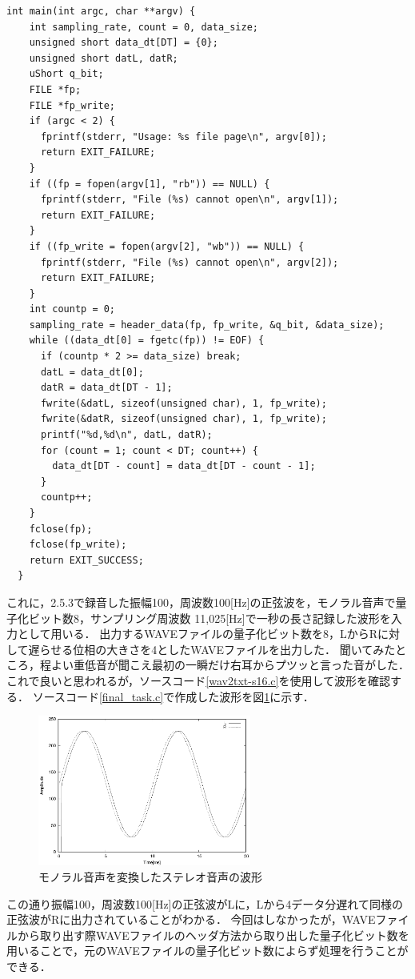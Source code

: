 \documentclass[titlepage]{jarticle}
\begin{document}
\begin{lstlisting}[caption=発展課題,label=final_task.c]
  int main(int argc, char **argv) {
    int sampling_rate, count = 0, data_size;
    unsigned short data_dt[DT] = {0};
    unsigned short datL, datR;
    uShort q_bit;
    FILE *fp;
    FILE *fp_write;
    if (argc < 2) {
      fprintf(stderr, "Usage: %s file page\n", argv[0]);
      return EXIT_FAILURE;
    }
    if ((fp = fopen(argv[1], "rb")) == NULL) {
      fprintf(stderr, "File (%s) cannot open\n", argv[1]);
      return EXIT_FAILURE;
    } 
    if ((fp_write = fopen(argv[2], "wb")) == NULL) {
      fprintf(stderr, "File (%s) cannot open\n", argv[2]);
      return EXIT_FAILURE;
    } 
    int countp = 0;
    sampling_rate = header_data(fp, fp_write, &q_bit, &data_size);
    while ((data_dt[0] = fgetc(fp)) != EOF) {
      if (countp * 2 >= data_size) break;
      datL = data_dt[0];
      datR = data_dt[DT - 1];
      fwrite(&datL, sizeof(unsigned char), 1, fp_write);
      fwrite(&datR, sizeof(unsigned char), 1, fp_write);
      printf("%d,%d\n", datL, datR);
      for (count = 1; count < DT; count++) {
        data_dt[DT - count] = data_dt[DT - count - 1];
      }
      countp++;
    }
    fclose(fp);
    fclose(fp_write);
    return EXIT_SUCCESS;
  }
\end{lstlisting}
これに，2.5.3で録音した振幅100，周波数100[Hz]の正弦波を，モノラル音声で量子化ビット数8，サンプリング周波数 11,025[Hz]で一秒の長さ記録した波形を入力として用いる．
出力するWAVEファイルの量子化ビット数を8，LからRに対して遅らせる位相の大きさを4としたWAVEファイルを出力した．
聞いてみたところ，程よい重低音が聞こえ最初の一瞬だけ右耳からプツッと言った音がした．
これで良いと思われるが，ソースコード\ref{wav2txt-s16.c}を使用して波形を確認する．
ソースコード\ref{final_task.c}で作成した波形を図\ref{final_task}に示す．
\begin{figure}[H]
  \centering
  \includegraphics[width=7cm]{EPS/final_task.eps}
  \caption{モノラル音声を変換したステレオ音声の波形}
  \label{final_task}
\end{figure}
この通り振幅100，周波数100[Hz]の正弦波がLに，Lから4データ分遅れて同様の正弦波がRに出力されていることがわかる．
今回はしなかったが，WAVEファイルから取り出す際WAVEファイルのヘッダ方法から取り出した量子化ビット数を用いることで，元のWAVEファイルの量子化ビット数によらず処理を行うことができる．
\end{document}
